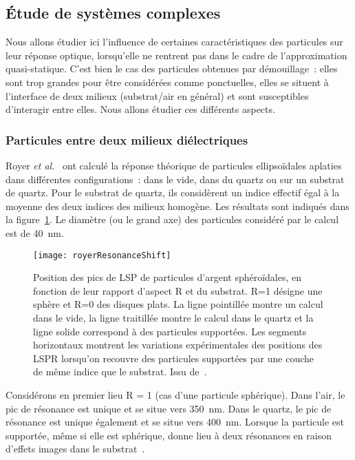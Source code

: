 	\subsection{Étude de systèmes complexes}
Nous allons étudier ici l'influence de certaines caractéristiques des particules sur leur réponse optique, lorsqu'elle ne rentrent pas dans le cadre de l'approximation quasi-statique. C'est bien le cas des particules obtenues par démouillage~: elles sont trop grandes pour être considérées comme ponctuelles, elles se situent à l'interface de deux milieux (substrat/air en général) et sont susceptibles d'interagir entre elles. Nous allons étudier ces différents aspects.\par 

		\subsubsection{Particules entre deux milieux diélectriques}
Royer \textit{et al.}~\cite{royer1987substrate} ont calculé la réponse théorique de particules ellipsoïdales aplaties dans différentes configurations~: dans le vide, dans du quartz ou sur un substrat de quartz. Pour le substrat de quartz, ils considèrent un indice effectif égal à la moyenne des deux indices des milieux homogène. Les résultats sont indiqués dans la figure~\ref{royerResonanceShift}. Le diamètre (ou le grand axe) des particules considéré par le calcul est de 40~nm.\par 
\begin{figure}[!htb]
	\centering
	\texttt{[image: royerResonanceShift]}
	\caption{Position des pics de LSP de particules d'argent sphéroïdales, en fonction de leur rapport d'aspect R et du substrat. R=1 désigne une sphère et R=0 des disques plats. La ligne pointillée montre un calcul dans le vide, la ligne traitillée montre le calcul dans le quartz et la ligne solide correspond à des particules supportées. Les segments horizontaux montrent les variations expérimentales des positions des LSPR lorsqu'on recouvre des particules supportées par une couche de même indice que le substrat. Issu de~\cite{royer1987substrate}.}
	\label{royerResonanceShift}
\end{figure}
Considérons en premier lieu R = 1 (cas d'une particule sphérique). Dans l'air, le pic de résonance est unique et se situe vers 350~nm. Dans le quartz, le pic de résonance est unique également et se situe vers 400~nm. Lorsque la particule est supportée, même si elle est sphérique, donne lieu à deux résonances en raison d'effets images dans le substrat~\cite{yamaguchi74}.\par 
